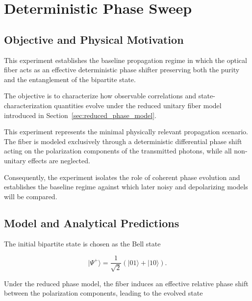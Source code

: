 
\section{Deterministic Phase Sweep}


\subsection{Objective and Physical Motivation}

This experiment establishes the baseline propagation regime in which the optical fiber acts as an effective deterministic phase shifter preserving both the purity and the entanglement of the bipartite state.

The objective is to characterize how observable correlations and state-characterization quantities evolve under the reduced unitary fiber model introduced in Section~\ref{sec:reduced_phase_model}.

This experiment represents the minimal physically relevant propagation scenario. The fiber is modeled exclusively through a deterministic differential phase shift acting on the polarization components of the transmitted photons, while all non-unitary effects are neglected.

Consequently, the experiment isolates the role of coherent phase evolution and establishes the baseline regime against which later noisy and depolarizing models will be compared.


\subsection{Model and Analytical Predictions}

The initial bipartite state is chosen as the Bell state

\[
|\Psi^{+}\rangle
=
\frac{1}{\sqrt{2}}
\left(
|01\rangle + |10\rangle
\right).
\]

Under the reduced phase model, the fiber induces an effective relative phase shift between the polarization components, leading to the evolved state

